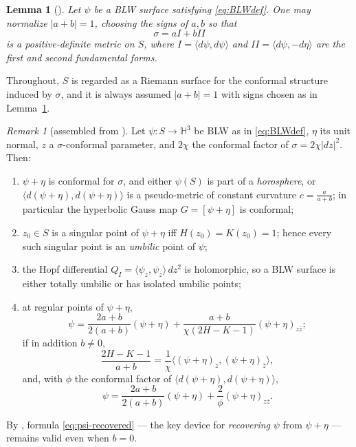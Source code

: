 \documentclass[11pt,a4paper]{article}
\newcommand{\Hyp}{\mathbb{H}^3}                      %
\newcommand{\ip}[2]{\langle #1,#2\rangle}            %
\theoremstyle{plain}
\newtheorem{lemma}[theorem]{Lemma}
\theoremstyle{definition}
\theoremstyle{remark}
\newtheorem{remark}[theorem]{Remark}
\begin{document}
\begin{lemma}[{\cite[Lemma 1]{GMM2}}]\label{lem:sigma}
Let $\psi$ be a BLW surface satisfying \eqref{eq:BLWdef}. One may
normalize $|a+b|=1$, choosing the signs of $a,b$ so that
\begin{equation}
  \sigma = aI+bI\!I
\end{equation}
is a positive-definite metric on $S$, where $I=\ip{d\psi}{d\psi}$ and
$I\!I=\ip{d\psi}{-d\eta}$ are the first and second fundamental forms.
\end{lemma}
Throughout, $S$ is regarded as a Riemann surface for the conformal
structure induced by $\sigma$, and it is always assumed $|a+b|=1$ with
signs chosen as in Lemma~\ref{lem:sigma}.

\begin{remark}[assembled from {\cite[Thm.\,1, its proof, and Remark 3]{GMM2}}]\label{rmk:psipluseta}
Let $\psi:S\to\Hyp$ be BLW as in \eqref{eq:BLWdef}, $\eta$ its unit normal,
$z$ a $\sigma$-conformal parameter, and $2\chi$ the conformal factor of
$\sigma=2\chi|dz|^2$. Then:
\begin{enumerate}[label=(\arabic*)]
\item $\psi+\eta$ is conformal for $\sigma$, and either $\psi(S)$ is
  part of a \emph{horosphere}, or $\ip{d(\psi+\eta)}{d(\psi+\eta)}$ is a
  pseudo-metric of constant curvature $c=\tfrac a{a+b}$; in particular the
  hyperbolic Gauss map $G=[\psi+\eta]$ is conformal;
\item $z_0\in S$ is a singular point of $\psi+\eta$ iff $H(z_0)=K(z_0)=1$;
  hence every such singular point is an \emph{umbilic} point of $\psi$;
\item the Hopf differential $Q_I=\ip{\psi_z}{\psi_z}\,dz^2$ is holomorphic,
  so a BLW surface is either totally umbilic or has isolated umbilic
  points;
\item at regular points of $\psi+\eta$,
  \begin{equation}
    \psi = \frac{2a+b}{2(a+b)}(\psi+\eta)
      + \frac{a+b}{\chi(2H-K-1)}(\psi+\eta)_{z\bar z};
  \end{equation}
  if in addition $b\neq0$,
  \begin{equation}\label{eq:2H-K-1}
    \frac{2H-K-1}{a+b}
      = \frac1\chi\ip{(\psi+\eta)_z}{(\psi+\eta)_{\bar z}},
  \end{equation}
  and, with $\phi$ the conformal factor of $\ip{d(\psi+\eta)}{d(\psi+\eta)}$,
  \begin{equation}\label{eq:psi-recovered}
    \psi = \frac{2a+b}{2(a+b)}(\psi+\eta) + \frac2\phi(\psi+\eta)_{z\bar z}.
  \end{equation}
\end{enumerate}
\end{remark}
By \cite{GMM1}, formula \eqref{eq:psi-recovered} — the key device for
\emph{recovering} $\psi$ from $\psi+\eta$ — remains valid even when $b=0$.
\end{document}
